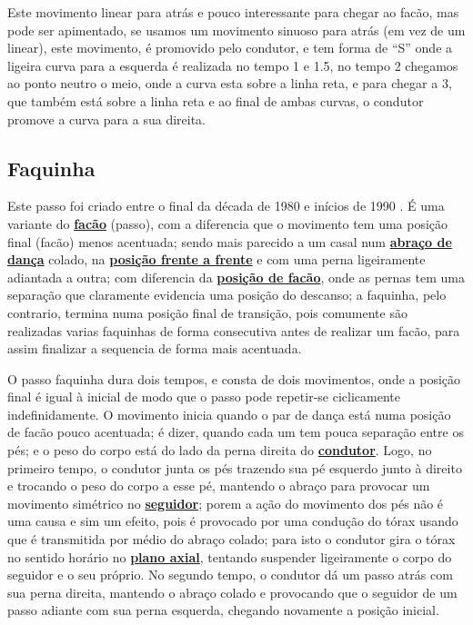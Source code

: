 Este movimento linear para atrás e pouco interessante para chegar ao facão, mas pode ser apimentado,
se usamos um movimento sinuoso para atrás (em vez de um linear), este movimento,
é promovido pelo condutor, e tem forma de ``S'' onde a ligeira curva para a esquerda é realizada no tempo 1 e 1.5,
no tempo  2 chegamos ao ponto neutro o meio, onde a curva esta sobre a linha reta, e para chegar a 3, 
que também está sobre a linha reta e ao final de ambas curvas,
o condutor promove a curva para a sua direita.

\subsection{Faquinha}
Este passo foi  criado entre o final da década de 1980 e inícios de 1990  \cite[pp. 143]{perna2002samba}.
É uma variante do  \hyperref[subsec:desc:passo:facao]{\textbf{facão}} (passo), 
com a diferencia que o movimento tem uma posição final (facão) menos acentuada;
sendo mais parecido a um casal num \hyperref[def:abracodedanca]{\textbf{abraço de dança}} colado, 
na \hyperref[def:frente-frente-position]{\textbf{posição frente a frente}}  e com uma perna ligeiramente adiantada a outra;
com diferencia da \hyperref[def:facao-position]{\textbf{posição de facão}}, 
onde as pernas tem uma separação que claramente evidencia uma posição do descanso;
a faquinha, pelo contrario, termina numa posição final de transição, 
pois comumente são realizadas varias faquinhas de forma consecutiva antes de realizar um facão,
 para assim finalizar a sequencia de forma mais acentuada.

O passo faquinha dura dois tempos, e consta de dois movimentos, 
onde a posição final é igual à inicial de modo que o passo pode repetir-se ciclicamente indefinidamente.
O movimento inicia quando o par de dança está numa posição de facão pouco acentuada;
é dizer, quando cada um tem pouca separação entre os pés; 
e o peso do corpo está do lado da perna direita do \hyperref[def:Condutor]{\textbf{condutor}}.
Logo, no primeiro tempo, 
o condutor junta os pés trazendo sua pé esquerdo junto à direito e trocando o peso do corpo a esse pé,
mantendo o abraço para provocar um movimento simétrico no \hyperref[def:Seguidor]{\textbf{seguidor}};
porem a ação do movimento dos pés não é uma causa e sim um efeito,
pois é provocado por uma condução do tórax usando que é transmitida por médio do abraço colado;
para isto o condutor gira o tórax no sentido horário no \hyperref[def:PlanoAxial]{\textbf{plano axial}},
tentando suspender ligeiramente o corpo do seguidor e o seu próprio.
No segundo tempo, o condutor dá um passo atrás com sua perna direita,
 mantendo o abraço colado e provocando que o seguidor de um passo adiante com sua perna esquerda,
chegando novamente a posição inicial.


